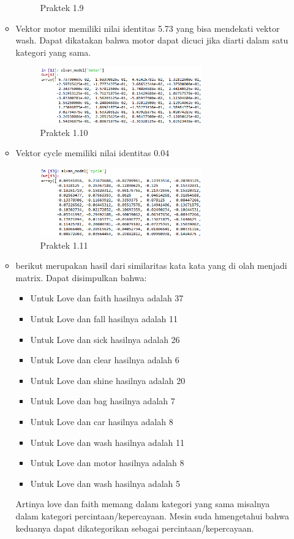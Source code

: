 \begin{enumerate}
\begin{itemize}
\begin{figure}[H]
			\centering
			\caption{Praktek 1.9}
		\end{figure}
		\item Vektor motor memiliki nilai identitas 5.73 yang bisa mendekati vektor wash. Dapat dikatakan bahwa motor dapat dicuci jika diarti dalam satu kategori yang sama.
		\hfill\break
		
		\begin{figure}[H]
			\includegraphics[width=7cm]{figures/1174077/5/p11.png}
			\centering
			\caption{Praktek 1.10}
		\end{figure}
		\item Vektor cycle memiliki nilai identitas 0.04
		\hfill\break
		
		\begin{figure}[H]
			\includegraphics[width=7cm]{figures/1174077/5/p12.png}
			\centering
			\caption{Praktek 1.11}
		\end{figure}
		\item berikut merupakan hasil dari similaritas kata kata yang di olah menjadi matrix.
		Dapat disimpulkan bahwa:
		\begin{itemize}
		\item Untuk Love dan faith hasilnya adalah 37 
		\item Untuk Love dan fall hasilnya adalah 11
		\item Untuk Love dan sick hasilnya adalah 26
		\item Untuk Love dan clear hasilnya adalah 6
		\item Untuk Love dan shine hasilnya adalah 20
		\item Untuk Love dan bag hasilnya adalah 7
		\item Untuk Love dan car hasilnya adalah 8
		\item Untuk Love dan wash hasilnya adalah 11
		\item Untuk Love dan motor hasilnya adalah 8
		\item Untuk Love dan wash hasilnya adalah 5
		\end{itemize}
		Artinya love dan faith memang dalam kategori yang sama misalnya dalam kategori percintaan/kepercayaan. Mesin suda hmengetahui bahwa keduanya dapat dikategorikan sebagai percintaan/kepercayaan.


\end{itemize}
\end{enumerate}
